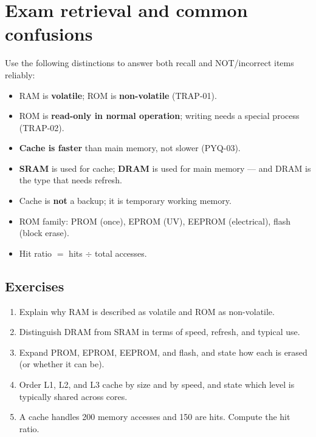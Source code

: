 \documentclass[11pt]{article}
\begin{document}
\section{Exam retrieval and common confusions}
Use the following distinctions to answer both recall and NOT/incorrect
items reliably:
\begin{itemize}
  \item RAM is \textbf{volatile}; ROM is \textbf{non-volatile} (TRAP-01).
  \item ROM is \textbf{read-only in normal operation}; writing needs a
    special process (TRAP-02).
  \item \textbf{Cache is faster} than main memory, not slower (PYQ-03).
  \item \textbf{SRAM} is used for cache; \textbf{DRAM} is used for main
    memory --- and DRAM is the type that needs refresh.
  \item Cache is \textbf{not} a backup; it is temporary working memory.
  \item ROM family: PROM (once), EPROM (UV), EEPROM (electrical), flash
    (block erase).
  \item Hit ratio $=$ hits $\div$ total accesses.
\end{itemize}

\subsection*{Exercises}
\begin{enumerate}[label=\arabic*.]
  \item Explain why RAM is described as volatile and ROM as non-volatile.
  \item Distinguish DRAM from SRAM in terms of speed, refresh, and typical
    use.
  \item Expand PROM, EPROM, EEPROM, and flash, and state how each is erased
    (or whether it can be).
  \item Order L1, L2, and L3 cache by size and by speed, and state which
    level is typically shared across cores.
  \item A cache handles 200 memory accesses and 150 are hits. Compute the
    hit ratio.
\end{enumerate}
\end{document}
